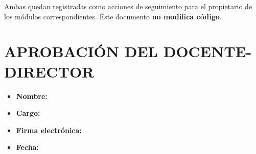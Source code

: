 \documentclass[
  spanish,
]{article}
\providecommand{\tightlist}{%
  \setlength{\itemsep}{0pt}\setlength{\parskip}{0pt}}
\begin{document}
Ambas quedan registradas como acciones de seguimiento para el
propietario de los módulos correspondientes. Este documento \textbf{no
modifica código}.

\section{APROBACIÓN DEL DOCENTE-DIRECTOR}\label{aprobacion-del-docente-director}

\begin{itemize}
\tightlist
\item
  \textbf{Nombre:}
\item
  \textbf{Cargo:}
\item
  \textbf{Firma electrónica:}
\item
  \textbf{Fecha:}
\end{itemize}
\end{document}
